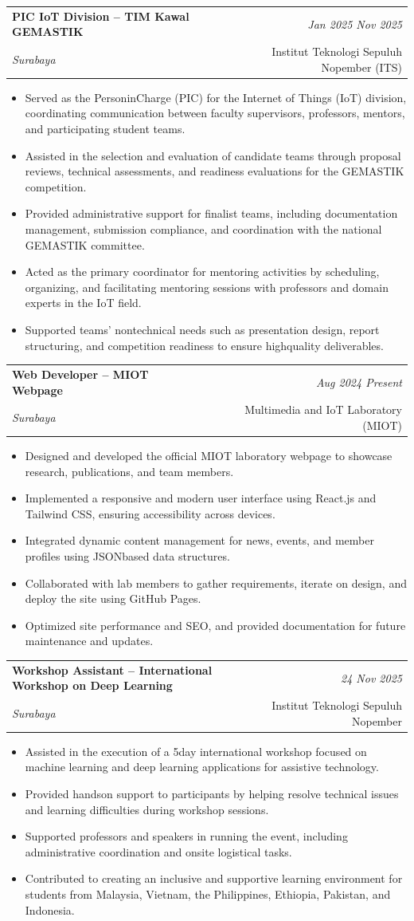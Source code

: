 \documentclass[a4paper,11pt]{article}
\makeatletter
\newcommand{\resumeSubheading}[4]{
\vspace{0.5mm}\item
    \begin{tabular*}{0.98\textwidth}[t]{l@{\extracolsep{\fill}}r}
        \textbf{#1} & \textit{\footnotesize{#4}} \\
        \textit{\footnotesize{#3}} &  \footnotesize{#2}\\
    \end{tabular*}
    \vspace{-2.4mm}
}
\newcommand{\resumeItemListStart}{\begin{justify}\begin{itemize}[leftmargin=3ex, rightmargin=2ex, noitemsep,labelsep=1.2mm,itemsep=0mm]\small}
\newcommand{\resumeItemListEnd}{\end{itemize}\end{justify}\vspace{-2mm}}
\makeatother
\begin{document}
\resumeSubheading
{PIC IoT Division – TIM Kawal GEMASTIK}{Institut Teknologi Sepuluh Nopember (ITS)}
{Surabaya}{Jan 2025 \- Nov 2025}
\resumeItemListStart
\item {Served as the Person\-in\-Charge (PIC) for the Internet of Things (IoT) division, coordinating communication between faculty supervisors, professors, mentors, and participating student teams.}
\item {Assisted in the selection and evaluation of candidate teams through proposal reviews, technical assessments, and readiness evaluations for the GEMASTIK competition.}
\item {Provided administrative support for finalist teams, including documentation management, submission compliance, and coordination with the national GEMASTIK committee.}
\item {Acted as the primary coordinator for mentoring activities by scheduling, organizing, and facilitating mentoring sessions with professors and domain experts in the IoT field.}
\item {Supported teams’ non\-technical needs such as presentation design, report structuring, and competition readiness to ensure high\-quality deliverables.}
\resumeItemListEnd

\resumeSubheading
{Web Developer – MIOT Webpage}
{Multimedia and IoT Laboratory (MIOT)}
{Surabaya}{Aug 2024\- Present}
\resumeItemListStart
\item {Designed and developed the official MIOT laboratory webpage to showcase research, publications, and team members.}
\item {Implemented a responsive and modern user interface using React.js and Tailwind CSS, ensuring accessibility across devices.}
\item {Integrated dynamic content management for news, events, and member profiles using JSON\-based data structures.}
\item {Collaborated with lab members to gather requirements, iterate on design, and deploy the site using GitHub Pages.}
\item {Optimized site performance and SEO, and provided documentation for future maintenance and updates.}
\resumeItemListEnd
\vspace{-4mm}

\resumeSubheading
{Workshop Assistant – International Workshop on Deep Learning}
{Institut Teknologi Sepuluh Nopember}{Surabaya}
{24 \- 29 Nov 2025}

\resumeItemListStart
\item {Assisted in the execution of a 5\-day international workshop focused on machine learning and deep learning applications for assistive technology.}
\item {Provided hands\-on support to participants by helping resolve technical issues and learning difficulties during workshop sessions.}
\item {Supported professors and speakers in running the event, including administrative coordination and on\-site logistical tasks.}
\item {Contributed to creating an inclusive and supportive learning environment for students from Malaysia, Vietnam, the Philippines, Ethiopia, Pakistan, and Indonesia.}
\resumeItemListEnd
\end{document}
